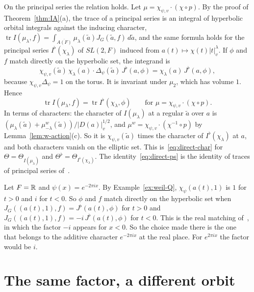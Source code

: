 On the principal series the relation holds. Let
$\mu=\chi_{\psi,v}\cdot(\chi\circ p)$. By the proof of
Theorem~\ref{thm:IA}(a), the trace of a principal series is an integral
of hyperbolic orbital integrals against the inducing character,
$\operatorname{tr}I(\mu_\lambda,f)=\int_{\overline{A(F)}}\mu_\lambda(
\tilde a)J_G(\tilde a,f)\,d\tilde a$, and the same formula holds for the
principal series $I^\flat(\chi_\lambda)$ of $SL(2,F)$ induced from
$a(t)\mapsto\chi(t)|t|_v^\lambda$. If $\phi$ and $f$ match directly on the
hyperbolic set, the integrand is
\[
\chi_{\psi,v}(\tilde a)\,\chi_\lambda(a)\cdot\Delta_\psi(\tilde a)\,
J^\flat(a,\phi)=\chi_\lambda(a)\,J^\flat(a,\phi),
\]
because $\chi_{\psi,v}\Delta_\psi=1$ on the torus. It is invariant under
$\mu_2$, which has volume $1$. Hence
\begin{equation}\label{eq:direct-ps}
\operatorname{tr}I(\mu_\lambda,f)=\operatorname{tr}I^\flat(\chi_\lambda,\phi)
\qquad\text{for }\mu=\chi_{\psi,v}\cdot(\chi\circ p).
\end{equation}
In terms of characters: the character of $I(\mu_\lambda)$ at a regular
$\tilde a$ over $a$ is $(\mu_\lambda(\tilde a)+\mu^w_{-\lambda}(\tilde a))/
|D(a)|_v^{1/2}$, and $\mu^w=\chi_{\psi,v}\cdot(\chi^{-1}\circ p)$ by
Lemma~\ref{lem:w-action}(c). So it is $\chi_{\psi,v}(\tilde a)$ times the
character of $I^\flat(\chi_\lambda)$ at $a$, and both characters vanish on
the elliptic set. This is~\eqref{eq:direct-char} for
$\Theta=\Theta_{I(\mu_\lambda)}$ and $\Theta^\flat=\Theta_{I^\flat(
\chi_\lambda)}$.
The identity~\eqref{eq:direct-ps} is the identity of traces of principal
series of~\cite{JC26}.

\begin{example}\label{ex:direct-real}
Let $F=\mathbb{R}$ and $\psi(x)=e^{-2\pi ix}$. By Example~\ref{ex:weil-Q},
$\chi_\psi(a(t),1)$ is $1$ for $t>0$ and $i$ for $t<0$. So $\phi$ and $f$
match directly on the hyperbolic set when
$J_G((a(t),1),f)=J^\flat(a(t),\phi)$ for $t>0$ and $J_G((a(t),1),f)=-i\,
J^\flat(a(t),\phi)$ for $t<0$. This is the real matching
of~\cite{JC26}, in which the factor $-i$ appears for $x<0$. So the
choice made there is the one that belongs to the additive character
$e^{-2\pi ix}$ at the real place. For $e^{2\pi ix}$ the factor would be
$i$.
\end{example}

\section{The same factor, a different orbit}\label{sec:wrong-orbit}

